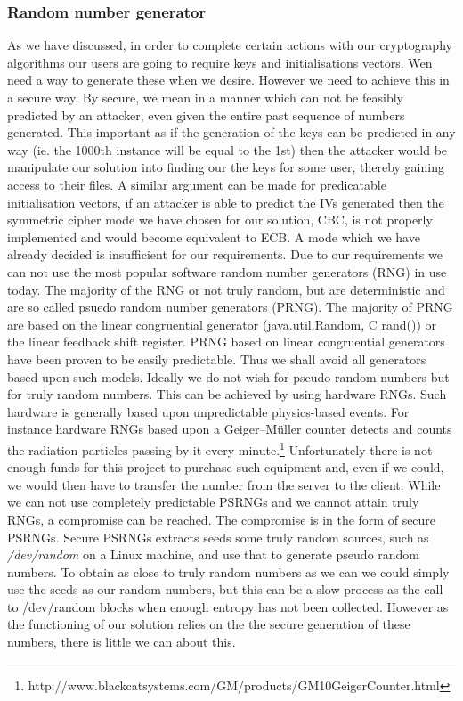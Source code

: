 \documentclass[12pt, titlepage]{article}
\begin{document}
\subsubsection{Random number generator}
As we have discussed, in order to complete certain actions with our cryptography algorithms our users are going to require keys and initialisations vectors. Wen need a way to generate these when we desire. However we need to achieve this in a secure way. By secure, we mean in a manner which can not be feasibly predicted by an attacker, even given the entire past sequence of numbers generated. This important as if the generation of the keys can be predicted in any way (ie. the 1000th instance will be equal to the 1st) then the attacker would be manipulate our solution into finding our the keys for some user, thereby gaining access to their files. A similar argument can be made for predicatable initialisation vectors, if an attacker is able to predict the IVs generated then the symmetric cipher mode we have chosen for our solution, CBC, is not properly implemented and would become equivalent to ECB. A mode which we have already decided is insufficient for our requirements.
\newline \indent Due to our requirements we can not use the most popular software random number generators (RNG) in use today. The majority of the RNG or not truly random, but are deterministic and are so called psuedo random number generators (PRNG). The majority of PRNG are based on the linear congruential generator (java.util.Random, C rand()) or the linear feedback shift register. PRNG based on linear congruential generators have been proven to be easily predictable.\cite{lcgPRNGPredictable} Thus we shall avoid all generators based upon such models.
\newline \indent Ideally we do not wish for pseudo random numbers but for truly random numbers. This can be achieved by using hardware RNGs. Such hardware is generally based upon unpredictable physics-based events. For instance hardware RNGs based upon a Geiger–Müller counter detects and counts the radiation particles passing by it every minute.\footnote{http://www.blackcatsystems.com/GM/products/GM10GeigerCounter.html} Unfortunately there is not enough funds for this project to purchase such equipment and, even if we could, we would then have to transfer the number from the server to the client.
\newline \indent While we can not use completely predictable PSRNGs and we cannot attain truly RNGs, a compromise can be reached. The compromise is in the form of secure PSRNGs. Secure PSRNGs extracts seeds some truly random sources, such as \textit{/dev/random} on a Linux machine, and use that to generate pseudo random numbers. To obtain as close to truly random numbers as we can we could simply use the seeds as our random numbers, but this can be a slow process as the call to /dev/random blocks when enough entropy has not been collected. However as the functioning of our solution relies on the 
the secure generation of these numbers, there is little we can about this.
\end{document}
